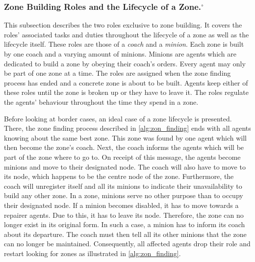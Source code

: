 \subsubsection[Zone Building Roles and the Lifecycle of a Zone.]{Zone Building Roles and the Lifecycle of a Zone.$^\circ$}\label{alg:zon_roles}
This subsection describes the two roles exclusive to zone building. It covers the roles' associated tasks and duties throughout the lifecycle of a zone as well as the lifecycle itself. These roles are those of a \emph{coach} and a \emph{minion}. Each zone is built by one coach and a varying amount of minions. Minions are agents which are dedicated to build a zone by obeying their coach's orders. Every agent may only be part of one zone at a time. %
The roles are assigned when the zone finding process has ended and a concrete zone is about to be built. Agents keep either of these roles until the zone is broken up or they have to leave it. The roles regulate the agents' behaviour throughout the time they spend in a zone.

Before looking at border cases, an ideal case of a zone lifecycle is presented. There, the zone finding process described in \autoref{alg:zon_finding} ends with all agents knowing about the same best zone. This zone was found by one agent which will then become the zone's coach. Next, the coach informs the agents which will be part of the zone where to go to. On receipt of this message, the agents become minions and move to their designated node. The coach will also have to move to its node, which happens to be the centre node of the zone. Furthermore, the coach will unregister itself and all its minions to indicate their unavailability to build any other zone.
In a zone, minions serve no other purpose than to occupy their designated node. If a minion becomes disabled, it has to move towards a repairer agents. Due to this, it has to leave its node. Therefore, the zone can no longer exist in its original form. In such a case, a minion has to inform its coach about its departure. The coach must then tell all its other minions that the zone can no longer be maintained. Consequently, all affected agents drop their role and restart looking for zones as illustrated in \autoref{alg:zon_finding}.

